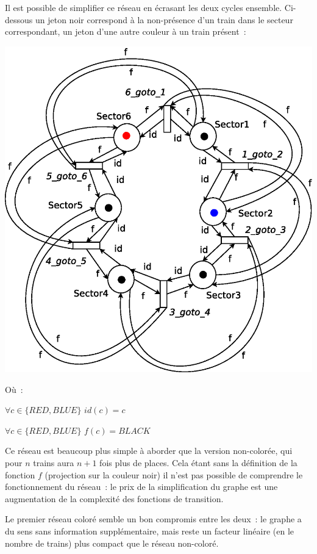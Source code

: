 Il est possible de simplifier ce réseau en écrasant les deux cycles ensemble. 
Ci-dessous un jeton noir correspond à la non-présence d'un train dans le secteur 
correspondant, un jeton d'une autre couleur à un train présent~:

\begin{center}
\includegraphics[height = 0.5\paperwidth]{exo8_coloured_2_v2.eps}
\end{center}

Où~:

$\forall c \in \{RED, BLUE\}$ $id(c) = c$

$\forall c \in \{RED, BLUE\}$ $f(c) = BLACK$

Ce réseau est beaucoup plus simple à aborder que la version
non-colorée, qui pour $n$ trains aura $n+1$ fois plus de places. Cela
étant sans la définition de la fonction $f$ (projection sur la couleur
noir) il n'est pas possible de comprendre le fonctionnement du
réseau~: le prix de la simplification du graphe est une augmentation
de la complexité des fonctions de transition.

Le premier réseau coloré semble un bon compromis entre les deux~: le
graphe a du sens sans information supplémentaire, mais reste un
facteur linéaire (en le nombre de trains) plus \og{}compact\fg{} que le réseau
non-coloré.



